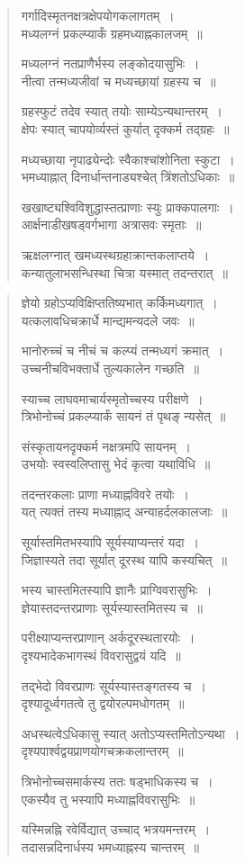 \documentclass[11pt, openany]{book}
\begin{document}
\begin{quote}
{\qt गर्गादिस्मृतनक्षत्रक्षेपयोगकलागतम्~।\\
 मध्यलग्नं प्रकल्प्यार्कं ग्रहमध्याह्नकालजम्~॥
 
मध्यलग्नं नतप्राणैर्भस्य लङ्कोदयासुभिः~।\\
नीत्वा तन्मध्यजीवां च मध्यच्छायां ग्रहस्य च~॥

ग्रहस्फुटं तदेव स्यात् तयोः साम्येऽन्यथान्तरम्~।\\
क्षेपः स्यात् चापयोर्व्यस्तं कुर्यात् दृक्कर्म तद्ग्रहः~॥

मध्यच्छाया नृपाढ्येन्दोः स्वैकाश्चांशोनिता स्कुटा~।\\
भमध्याह्नात् दिनार्धान्तनाड्यश्चेत् त्रिंशतोऽधिकाः~॥

खखाष्ट्यश्विविशुद्धास्तत्प्राणाः स्युः प्राक्कपालगाः~।\\
आर्क्षनाडीखषड्वर्गभागा अत्रासवः स्मृताः~॥

ऋक्षलग्नात् खमध्यस्थग्रहाक्रान्तकलाप्तये~।\\
कन्यातुलाभसन्धिस्था चित्रा यस्मात् तदन्तरात्~॥} 
\end{quote}

\newpage

\begin{quote}
{\qt ज्ञेयो ग्रहोऽप्यविक्षिप्ततिष्यभात् कर्किमध्यगात्~।\\
यत्कलावधिचक्रार्धे मान्द्यमन्यदले जवः~॥

भानोरुच्चं च नीचं च कल्प्यं तन्मध्यगं क्रमात्~।\\
उच्चनीचविभक्तार्धे तुल्यकालेन गच्छति~॥

स्याच्च लाघवमाचार्यस्मृतोच्चस्य परीक्षणे~।\\
त्रिभोनोच्चं प्रकल्प्यार्कं सायनं तं पृथङ् न्यसेत्~॥

संस्कृतायनदृक्कर्म नक्षत्रमपि सायनम्~।\\
उभयोः स्वस्वलिप्तासु भेदं कृत्वा यथाविधि~॥

तदन्तरकलाः प्राणा मध्याह्नविवरे तयोः~।\\
यत् त्यक्तं तस्य मध्याह्नाद् अन्याहर्दलकालजाः~॥

सूर्यास्तमितभस्यापि सूर्यस्याप्यन्तरं यदा~।\\
जिज्ञास्यते तदा सूर्यात् दूरस्थ यापि कस्यचित्~॥

भस्य चास्तमितस्यापि ज्ञानैः प्राग्विवरासुभिः~।\\
ज्ञेयास्तदन्तरप्राणाः सूर्यस्यास्तमितस्य च~॥

परीक्ष्याप्यन्तरप्राणान् अर्कदूरस्थतारयोः~।\\
दृश्यभादेकभागस्थं विवरासुद्वयं यदि~॥

तद्भेदो विवरप्राणः सूर्यस्यास्तङ्गतस्य च~।\\
दृश्यादूर्ध्वगतत्वे तु द्वयोरल्पमधोगतम्~॥

अधस्थत्वेऽधिकासु स्यात् अतोऽप्यस्तमितोऽन्यथा~।\\
दृश्यपार्श्वद्वयप्राणयोगचक्रकलान्तरम्~॥

त्रिभोनोच्चसमार्कस्य ततः षड्भाधिकस्य च~।\\
एकस्यैव तु भस्यापि मध्याह्नविवरासुभिः~॥

यस्मिन्नह्नि रवेर्विद्यात् उच्चाद् भत्रयमन्तरम्~।\\
तदासन्नदिनार्धस्य भमध्याह्नस्य चान्तरम्~॥} 
\end{quote}
\end{document}
